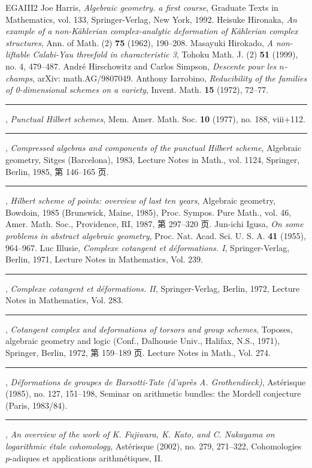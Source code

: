 \begin{thebibliography}{EGAIII2}
 Joe Harris, \emph{Algebraic geometry. a first course}, Graduate Texts in Mathematics, vol. 133, Springer-Verlag, New York, 1992.
 Heisuke Hironaka, \emph{An example of a non-Kählerian complex-analytic deformation of Kählerian complex structures}, Ann. of Math. (2) \textbf{75} (1962), 190--208.
 Masayuki Hirokado, \emph{A non-liftable Calabi-Yau threefold in characteristic 3}, Tohoku Math. J. (2) \textbf{51} (1999), no. 4, 479--487.
 André Hirschowitz and Carlos Simpson, \emph{Descente pour les $n$-champs}, arXiv: math.AG/9807049.
 Anthony Iarrobino, \emph{Reducibility of the families of 0-dimensional schemes on a variety}, Invent. Math. \textbf{15} (1972), 72--77.
 \rule{2em}{.3pt}, \emph{Punctual Hilbert schemes}, Mem. Amer. Math. Soc. \textbf{10} (1977), no. 188, viii+112.
 \rule{2em}{.3pt}, \emph{Compressed algebras and components of the punctual Hilbert scheme}, Algebraic geometry, Sitges (Barcelona), 1983, Lecture Notes in Math., vol. 1124, Springer, Berlin, 1985, 第 146--165 页.
 \rule{2em}{.3pt}, \emph{Hilbert scheme of points: overview of last ten years}, Algebraic geometry, Bowdoin, 1985 (Brunswick, Maine, 1985), Proc. Sympos. Pure Math., vol. 46, Amer. Math. Soc., Providence, RI, 1987, 第 297--320 页.
 Jun-ichi Igusa, \emph{On some problems in abstract algebraic geometry}, Proc. Nat. Acad. Sci. U. S. A. \textbf{41} (1955), 964--967.
 Luc Illusie, \emph{Complexe cotangent et déformations. I}, Springer-Verlag, Berlin, 1971, Lecture Notes in Mathematics, Vol. 239.
 \rule{2em}{.3pt}, \emph{Complexe cotangent et déformations. II}, Springer-Verlag, Berlin, 1972, Lecture Notes in Mathematics, Vol. 283.
 \rule{2em}{.3pt}, \emph{Cotangent complex and deformations of torsors and group schemes}, Toposes, algebraic geometry and logic (Conf., Dalhousie Univ., Halifax, N.S., 1971), Springer, Berlin, 1972, 第 159--189 页. Lecture Notes in Math., Vol. 274.
 \rule{2em}{.3pt}, \emph{Déformations de groupes de Barsotti-Tate (d'après A. Grothendieck)}, Astérisque (1985), no. 127, 151--198, Seminar on arithmetic bundles: the Mordell conjecture (Paris, 1983/84).
 \rule{2em}{.3pt}, \emph{An overview of the work of K. Fujiwara, K. Kato, and C. Nakayama on logarithmic étale cohomology}, Astérisque (2002), no. 279, 271--322, Cohomologies $p$-adiques et applications arithmétiques, II.

\end{thebibliography}

